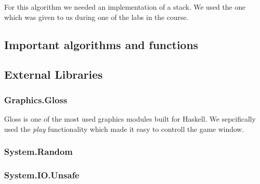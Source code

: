 \documentclass[12pt, a4paper]{article}
\begin{document}
            

For this algorithm we needed an implementation of a stack. We used the one which was given to us during one of the labs in the course. 



\subsection{Important algorithms and functions}



\subsection{External Libraries}
\subsubsection{Graphics.Gloss}
Gloss is one of the most used graphics modules built for Haskell. We sepcifically used the \textit{play} functionality which made it easy to controll the game window. 

\subsubsection{System.Random}

\subsubsection{System.IO.Unsafe}
\end{document}
